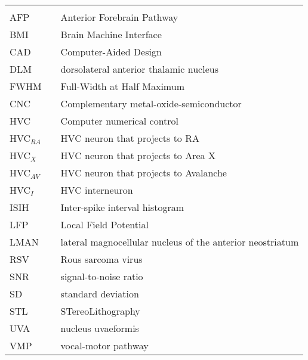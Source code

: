 \begin{center}
  \begin{tabular}{lll}

    \hspace*{2em} & \hspace*{1in} & \hspace*{4.5in} \\
    AFP  & \dotfill & Anterior Forebrain Pathway \\
    BMI   & \dotfill & Brain Machine Interface \\
    CAD  & \dotfill & Computer-Aided Design \\
    DLM & \dotfill & dorsolateral anterior thalamic nucleus \\
    FWHM & \dotfill & Full-Width at Half Maximum \\
    CNC & \dotfill & Complementary metal-oxide-semiconductor \\
    HVC & \dotfill & Computer numerical control  \\
    HVC$_{RA}$  & \dotfill & HVC neuron that projects to RA \\
	HVC$_{X}$  & \dotfill & HVC neuron that projects to Area X\\
	HVC$_{AV}$  & \dotfill & HVC neuron that projects to Avalanche \\
	HVC$_{I}$  & \dotfill & HVC interneuron\\
    ISIH  & \dotfill & Inter-spike interval histogram\\
    LFP  & \dotfill & Local Field Potential \\
    LMAN  & \dotfill & lateral magnocellular nucleus of the anterior neostriatum \\
    RSV & \dotfill &  Rous sarcoma virus \\
    SNR  & \dotfill & signal-to-noise ratio \\
    SD  & \dotfill & standard deviation \\
    STL & \dotfill & STereoLithography \\
    UVA   & \dotfill & nucleus uvaeformis \\
    VMP  & \dotfill & vocal-motor pathway \\
    
  \end{tabular}
\end{center}
\cleardoublepage


\newpage
\endofprelim
